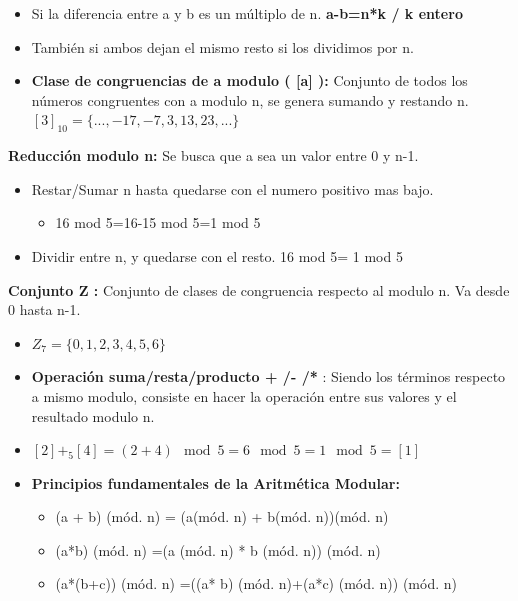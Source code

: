 \documentclass[12pt, twoside, openright]{report} %
\begin{document}
  \begin{itemize}
  \item Si la diferencia entre a y b es un múltiplo de n. \textbf{a-b=n*k /
    k entero}
    
  \item También si ambos dejan el mismo resto si los dividimos por n.
    
  \item \textbf{Clase de congruencias de a modulo ( {[}a{]} ):} Conjunto de
    todos los números congruentes con a modulo n, se genera sumando y
    restando n. $[3]_{10}=\{..., -17, -7, 3, 13, 23,...\}$
    
  \end{itemize}

  
  \textbf{Reducción modulo n:} Se busca que a sea un valor entre 0 y
  n-1.
  

  \begin{itemize}
  \item Restar/Sumar n hasta quedarse con el numero positivo mas bajo.
    

    \begin{itemize}
    \item 16 mod 5=16-15 mod 5=1 mod 5
      
    \end{itemize}
  \item Dividir entre n, y quedarse con el resto. 16 mod 5= 1 mod 5
    
  \end{itemize}

  
  \textbf{Conjunto Z :} Conjunto de clases de congruencia respecto al
  modulo n. Va desde 0 hasta n-1.
  

  \begin{itemize}
  \item
    
	$Z_7 = \{0, 1, 2, 3, 4, 5, 6\}$
    
  \end{itemize}

  \begin{itemize}
  \item \textbf{Operación suma/resta/producto + /- /*} : Siendo los términos
    respecto a mismo modulo, consiste en hacer la operación entre sus
    valores y el resultado modulo n.
    
  \item $[2]+_5[4]=(2+4) \mod 5 = 6 \mod 5 = 1 \mod 5 = [1]$
  \item \textbf{Principios fundamentales de la Aritmética Modular:}
    

    \begin{itemize}
    \item (a + b) (mód. n) = (a(mód. n) + b(mód. n))(mód. n)
      
    \item (a*b) (mód. n) =(a (mód. n) * b (mód. n)) (mód. n)
      
    \item (a*(b+c)) (mód. n) =((a* b) (mód. n)+(a*c) (mód. n)) (mód. n)
      
    \end{itemize}
  \end{itemize}
\end{document}
